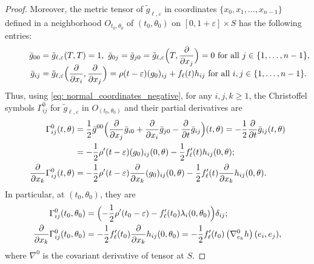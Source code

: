 \documentclass[10pt]{amsart}
\theoremstyle{definition}
\let\eps\varepsilon
\renewcommand{\>}{{\rangle}}
\newcommand{\<}{{\langle}}
\begin{document}
\begin{proof}
Moreover, the metric tensor of $\tilde g_{\ell,\eps}$ in coordinates $\{x_0, x_1,\ldots, x_{n-1}\}$ defined in a neighborhood $O_{t_0,\theta_0}$ of $(t_0,\theta_0)$ on $[0,1+\eps]\times S$ has the following entries:
\begin{align}
\hspace*{1cm}\bar g_{00} &= \tilde g_{\ell,\eps}(T, T)=1, \ \bar g_{0j} = \bar g_{j0}=\tilde g_{\ell,\eps}\Bigl(T,\frac{\partial}{\partial x_j}\Bigr)=0 \text{ for all } j\in\{1,\ldots,n-1\},\notag\\[-11pt]\label{metric_tensor_negative}\\[-11pt]
\hspace*{1cm}\bar g_{ij} &= \tilde g_{\ell,\eps}\Bigl(\frac{\partial}{\partial x_i},\frac{\partial}{\partial x_j}\Bigr) = \rho(t-\eps)(g_0)_{ij}+f_\ell(t)h_{ij} \text{ for all } i,j\in\{1,\ldots, n-1\}.\nonumber
\end{align}
Thus, using \eqref{eq: normal_coordinates_negative}, for any $i,j,k\geq 1$, the Christoffel symbols $\Gamma^0_{ij}$ for $\tilde g_{\ell,\eps}$ in $O_{(t_0,\theta_0)}$ and their partial derivatives are
\begin{align*}
\Gamma^0_{ij}(t,\theta) &= \frac{1}{2}\bar g^{00}\Bigl(\frac{\partial}{\partial x_j}\bar g_{i0}+\frac{\partial}{\partial x_i}\bar g_{j0}-\frac{\partial}{\partial t}\bar g_{ij}\Bigr) (t,\theta)= -\frac{1}{2}\frac{\partial}{\partial t}\bar g_{ij} (t,\theta)\\
&=-\frac{1}{2}\rho'(t-\eps)(g_0)_{ij} (0,\theta)-\frac{1}{2}f'_\ell(t)h_{ij} (0,\theta);
\\
\frac{\partial}{\partial x_k}\Gamma^0_{ij}(t,\theta)&=-\frac{1}{2}\rho'(t-\eps)\frac{\partial}{\partial x_k}(g_0)_{ij}(0,\theta)-\frac{1}{2}f'_\ell(t)\frac{\partial}{\partial x_k}h_{ij}(0,\theta).
\end{align*}
In particular, at $(t_0,\theta_0)$, they are
\begin{align*}
\Gamma^0_{ij}(t_0,\theta_0) &= \Bigl(-\frac{1}{2}\rho'(t_0-\eps)-f'_\ell(t_0)\lambda_i(0,\theta_0)\Bigr)\delta_{ij};
\\
\frac{\partial}{\partial x_k}\Gamma^0_{ij}(t_0,\theta_0)&=-\frac{1}{2}f'_\ell(t_0)\frac{\partial}{\partial x_k}h_{ij}(0,\theta_0) = -\frac{1}{2}f'_\ell(t_0)\left(\nabla^0_{e_k} h\right)(e_i,e_j),
\end{align*}
where $\nabla^0$ is the covariant derivative of tensor at $S$.


\end{proof}
\end{document}
